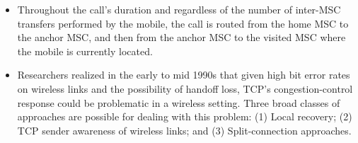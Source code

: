 \begin{itemize}
\item
Throughout the call's duration and regardless of the number of inter-MSC transfers performed by the mobile, the call is routed from the home MSC to the anchor MSC, and then from the anchor MSC to the visited MSC where the mobile is currently located.

\item
Researchers realized in the early to mid 1990s that given high bit error rates on wireless links and the possibility of handoff loss, TCP's congestion-control response could be problematic in a wireless setting. Three broad classes of approaches are possible for dealing with this problem: (1) Local recovery; (2) TCP sender awareness of wireless links; and (3) Split-connection approaches.

\end{itemize}